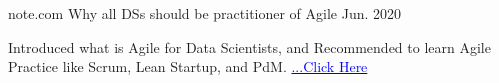 

\begin{cventries}

  \cventry
    {note.com} %
    {Why all DSs should be practitioner of Agile} %
    {} %
    {Jun. 2020} %
    {
      \begin{cvitems} %
        \item {Introduced what is Agile for Data Scientists, and Recommended to learn Agile Practice like Scrum, Lean Startup, and PdM. \href{https://note.com/87date/n/n0bd89605971c}{\textcolor{blue}{...Click Here}}}
      \end{cvitems}
    }

\end{cventries}
